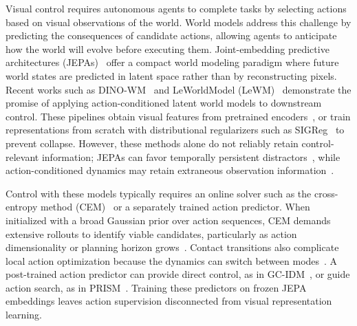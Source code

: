 \documentclass{article} %
\newcommand{\methodname}[1]{\textup{#1}}
\begin{document}
Visual control requires autonomous agents to complete tasks by selecting actions based on visual observations of the world. World models address this challenge by predicting the consequences of candidate actions, allowing agents to anticipate how the world will evolve before executing them. Joint-embedding predictive architectures (JEPAs)~\citep{lecun2022apath} offer a compact world modeling paradigm where future world states are predicted in latent space rather than by reconstructing pixels. 
Recent works such as \methodname{DINO-WM}~\citep{zhou2024dinowm} and \methodname{LeWorldModel (LeWM)}~\citep{maes2026lewm} demonstrate the promise of applying action-conditioned latent world models to downstream control. These pipelines obtain visual features from pretrained encoders~\citep{zhou2024dinowm,assran2025vjepa2}, or train representations from scratch with distributional regularizers such as \methodname{SIGReg}~\citep{balestriero2025lejepa,maes2026lewm} to prevent collapse. However, these methods alone do not reliably retain control-relevant information; JEPAs can favor temporally persistent distractors~\citep{sobal2022slowfeatures}, while action-conditioned dynamics may retain extraneous observation information~\citep{brandfonbrener2023inverse}.

Control with these models typically requires an online solver such as the cross-entropy method (CEM)~\citep{rubinstein1999cem} or a separately trained action predictor. When initialized with a broad Gaussian prior over action sequences, CEM demands extensive rollouts to identify viable candidates, particularly as action dimensionality or planning horizon grows~\citep{huang2021cemgd}. Contact transitions also complicate local action optimization because the dynamics can switch between modes~\citep{pang2023contactplanning}. A post-trained action predictor can provide direct control, as in \methodname{GC-IDM}~\citep{nguyen2026gcidm}, or guide action search, as in \methodname{PRISM}~\citep{wang2026prism}. Training these predictors on frozen JEPA embeddings leaves action supervision disconnected from visual representation learning.
\end{document}
